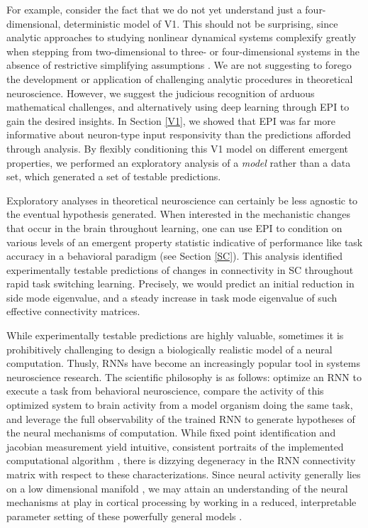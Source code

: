 \documentclass[11pt]{article}
\begin{document}
For example, consider the fact that we do not yet understand just a four-dimensional, deterministic model of V1.  
This should not be surprising, since analytic approaches to studying nonlinear dynamical systems complexify greatly when stepping from two-dimensional to three- or four-dimensional systems in the absence of restrictive simplifying assumptions \cite{strogatz1994nonlinear}. 
We are not suggesting to forego the development or application of challenging analytic procedures in theoretical neuroscience.
However, we suggest the judicious recognition of arduous mathematical challenges, and alternatively using deep learning through EPI to gain the desired insights.
In Section \ref{V1}, we showed that EPI was far more informative about neuron-type input responsivity than the predictions afforded through analysis.
By flexibly conditioning this V1 model on different emergent properties, we performed an exploratory analysis of a \emph{model} rather than a data set, which generated a set of testable predictions.

Exploratory analyses in theoretical neuroscience can certainly be less agnostic to the eventual hypothesis generated.  When interested in the mechanistic changes that occur in the brain throughout learning, one can use EPI to condition on various levels of an emergent property statistic indicative of performance like task accuracy in a behavioral paradigm (see Section \ref{SC}).
This analysis identified experimentally testable predictions of changes in connectivity in SC throughout rapid task switching learning.
Precisely, we would predict an initial reduction in side mode eigenvalue, and a steady increase in task mode eigenvalue of such effective connectivity matrices.   

While experimentally testable predictions are highly valuable, sometimes it is prohibitively challenging to design a biologically realistic model of a neural computation.
Thusly, RNNs have become an increasingly popular tool in systems neuroscience research.  
The scientific philosophy is as follows: optimize an RNN to execute a task from behavioral neuroscience, compare the activity of this optimized system to brain activity from a model organism doing the same task, and leverage the full observability of the trained RNN to generate hypotheses of the neural mechanisms of computation.  
While fixed point identification and jacobian measurement yield intuitive, consistent portraits of the implemented computational algorithm \cite{universality2019Maheswaranathan}, there is dizzying degeneracy in the RNN connectivity matrix with respect to these characterizations.  
Since neural activity generally lies on a low dimensional manifold \cite{gao2015simplicity}, we may attain an understanding of the neural mechanisms at play in cortical processing by working in a reduced, interpretable parameter setting of these powerfully general models \cite{doya1993universality}.
\end{document}
